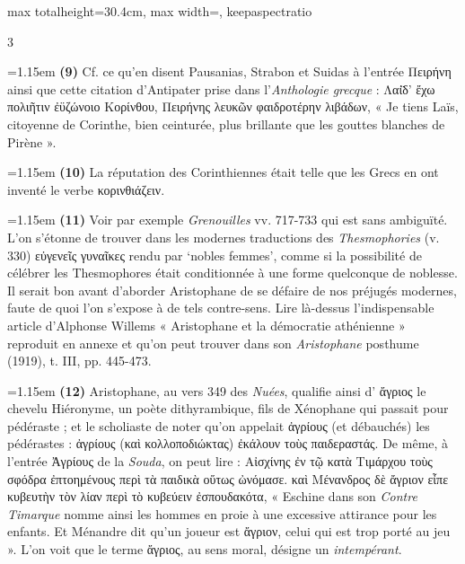 \documentclass[11pt,twoside]{book}
\newcommand{\italique}[1]{\textit{#1}}
\begin{document}
\begin{adjustbox}{max totalheight=30.4cm, max width=\textwidth, keepaspectratio}
\begin{minipage}{\textwidth}
{\begin{multicols}{3}
\par\vspace{1.5pt}
\noindent\hangindent=1.15em {\color{sepiaNote}\textbf{(9)}} Cf. ce qu'en disent Pausanias, Strabon et Suidas à l'entrée Πειρήνη ainsi que cette citation d'Antipater prise dans l'\italique{Anthologie grecque} : Λαί̈δ' ἔχω πολιῆτιν ἐϋζώνοιο Κορίνθου, Πειρήνης λευκῶν φαιδροτέρην λιβάδων, « Je tiens Laïs, citoyenne de Corinthe, bien ceinturée, plus brillante que les gouttes blanches de Pirène ».
\par\vspace{1.5pt}
\noindent\hangindent=1.15em {\color{sepiaNote}\textbf{(10)}} La réputation des Corinthiennes était telle que les Grecs en ont inventé le verbe κορινθιάζειν.
\par\vspace{1.5pt}
\noindent\hangindent=1.15em {\color{sepiaNote}\textbf{(11)}} Voir par exemple \italique{Grenouilles} vv. 717-733 qui est sans ambiguïté. L'on s'étonne de trouver dans les modernes traductions des \italique{Thesmophories} (v. 330) εὐγενεῖς γυναῖκες rendu par `nobles femmes', comme si la possibilité de célébrer les Thesmophores était conditionnée à une forme quelconque de noblesse. Il serait bon avant d'aborder Aristophane de se défaire de nos préjugés modernes, faute de quoi l'on s'expose à de tels contre-sens. Lire là-dessus l'indispensable article d'Alphonse Willems « Aristophane et la démocratie athénienne » reproduit en annexe et qu'on peut trouver dans son \italique{Aristophane} posthume (1919), t. III, pp. 445-473.
\par\vspace{1.5pt}
\noindent\hangindent=1.15em {\color{sepiaNote}\textbf{(12)}} Aristophane, au vers 349 des \italique{Nuées}, qualifie ainsi d' ἄγριος le chevelu Hiéronyme, un poète dithyrambique, fils de Xénophane qui passait pour pédéraste ; et le scholiaste de noter qu'on appelait ἀγρίους (et débauchés) les pédérastes : ἀγρίους (καὶ κολλοποδιώκτας) ἐκάλουν τοὺς παιδεραστάς. De même, à l'entrée Ἀγρίους de la \italique{Souda}, on peut lire : Αἰσχίνης ἐν τῷ κατὰ Τιμάρχου τοὺς σφόδρα ἐπτοημένους περὶ τὰ παιδικὰ οὕτως ὠνόμασε. καὶ Μένανδρος δὲ ἄγριον εἶπε κυβευτὴν τὸν λίαν περὶ τὸ κυβεύειν ἐσπουδακότα, « Eschine dans son \italique{Contre Timarque} nomme ainsi les hommes en proie à une excessive attirance pour les enfants. Et Ménandre dit qu'un joueur est ἄγριον, celui qui est trop porté au jeu ». L'on voit que le terme ἄγριος, au sens moral, désigne un \italique{intempérant}.
\par\vspace{1.5pt}

\end{multicols}}
\end{minipage}
\end{adjustbox}
\end{document}
